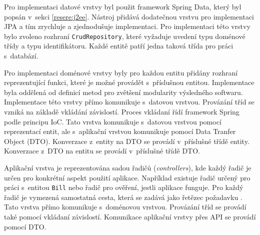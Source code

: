     Pro implementaci datové vrstvy byl použit framework Spring Data, který byl popsán v~sekci \ref{resere:j2ee}. Nástroj přidává dodatečnou vrstvu pro implementaci JPA a tím zrychluje a zjednodušuje implementaci. Pro implementaci této vrstvy bylo zvoleno rozhraní \verb|CrudRepository|, které vyžaduje uvedení typu doménové třídy a typu identifikátoru. Každé entitě patří jedna taková třída pro práci s~databází.
    
    Pro implementaci doménové vrstvy byly pro každou entitu přidány rozhraní reprezentující funkci, které je možné provádět s~příslušnou entitou. Implementace byla oddělená od definicí metod pro zvětšení modularity výsledného softwaru. Implementace této vrstvy přímo komunikuje s~datovou vrstvou. Provázání tříd se vzniká na základě vkládání závislostí. Proces vkládaní řídí framework Spring podle principu IoC. Tato vrstva komunikuje s~datovou vrstvou pomocí reprezentací entit, ale s~aplikační vrstvou komunikuje pomocí Data Tranfer Object (DTO). Konverzace z~entity na DTO se provádí v~příslušné třídě entity. Konverzace z~DTO na entitu se provádí v~příslušné třídě DTO.
    
    Aplikační vrstva je reprezentována sadou řadičů (\textit{controllers}), kde každý řadič je určen pro konkrétní aspekt použití aplikace. Například existuje řadič určený pro práci s~entitou \verb|Bill| nebo řadič pro ověření, jestli aplikace funguje. Pro každý řadič je vymezená samostatná cesta, která se zadává jako řetězec požadavku \cite{http-request-components}. Tato vrstva přímo komunikuje s~doménovou vrstvou. Provázání tříd se provádí také pomocí vkládaní závislostí. Komunikace aplikační vrstvy přes API se provádí pomocí DTO.
    
